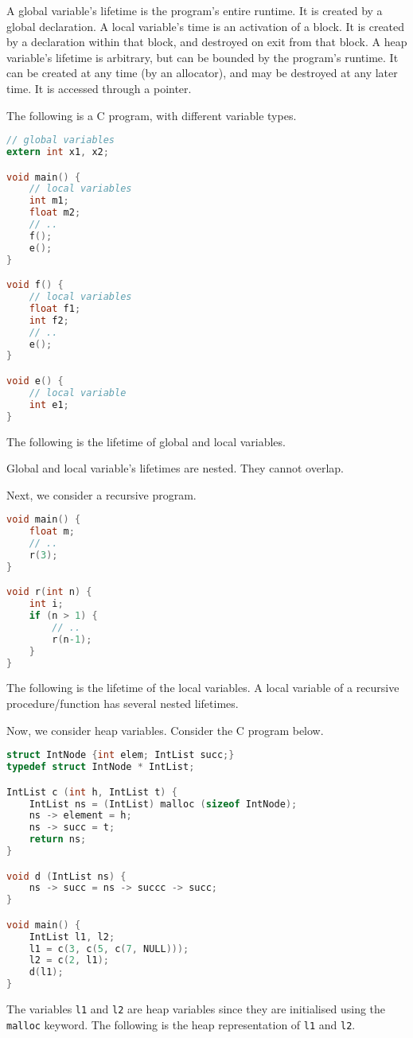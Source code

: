\documentclass[a4paper, openany]{memoir}
\begin{document}
A global variable's lifetime is the program's entire runtime. It is created by a global declaration. A local variable's time is an activation of a block. It is created by a declaration within that block, and destroyed on exit from that block. A heap variable's lifetime is arbitrary, but can be bounded by the program's runtime. It can be created at any time (by an allocator), and may be destroyed at any later time. It is accessed through a pointer.

The following is a C program, with different variable types.
\begin{lstlisting}[language=C]
// global variables
extern int x1, x2;

void main() {
    // local variables
    int m1;
    float m2;
    // .. 
    f();
    e();
}

void f() {
    // local variables
    float f1;
    int f2;
    // ..
    e();
}

void e() {
    // local variable
    int e1;
}
\end{lstlisting}
The following is the lifetime of global and local variables.

Global and local variable's lifetimes are nested. They cannot overlap.

Next, we consider a recursive program.
\begin{lstlisting}[language=C]
void main() {
    float m;
    // ..
    r(3);
}

void r(int n) {
    int i;
    if (n > 1) {
        // ..
        r(n-1);
    }
}
\end{lstlisting}
The following is the lifetime of the local variables.
A local variable of a recursive procedure/function has several nested lifetimes.

Now, we consider heap variables. Consider the C program below.
\begin{lstlisting}[language=C]
struct IntNode {int elem; IntList succ;}
typedef struct IntNode * IntList;

IntList c (int h, IntList t) {
    IntList ns = (IntList) malloc (sizeof IntNode);
    ns -> element = h;
    ns -> succ = t;
    return ns;
}

void d (IntList ns) {
    ns -> succ = ns -> succc -> succ;
}

void main() {
    IntList l1, l2;
    l1 = c(3, c(5, c(7, NULL)));
    l2 = c(2, l1);
    d(l1);
}
\end{lstlisting}
The variables \texttt{l1} and \texttt{l2} are heap variables since they are initialised using the \texttt{malloc} keyword. The following is the heap representation of \texttt{l1} and \texttt{l2}.
\end{document}
